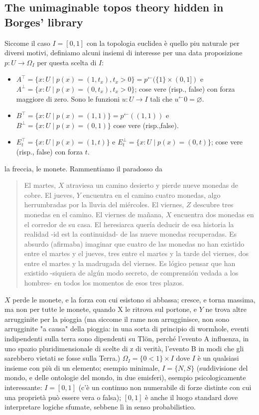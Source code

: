 \subsection{The unimaginable topos theory hidden in Borges' library}
\begin{remark}
  Siccome il caso $I=[0,1]$ con la topologia euclidea è quello piu naturale per diversi motivi, definiamo alcuni insiemi di interesse per una data proposizione $p : U \to \Omega_I$ per questa scelta di $I$:
\begin{itemize}
  \item $A^\top = \{x : U \mid p(x) = (1,t_x), t_x > 0\} = p^\leftarrow(\{1\}\times (0,1])$ e $A^\perp = \{x : U \mid p(x) = (0,t_x), t_x > 0\}$; cose vere (risp., false) con forza maggiore di zero. Sono le funzioni $u : U \to I$ tali che $u^\leftarrow 0 = \varnothing$.
  \item $B^\top = \{x : U \mid p(x) = (1,1)\} = p^\leftarrow((1,1))$ e $B^\perp = \{x : U \mid p(x) = (0,1)\}$ cose vere (risp.,false).
  \item $E_t^\top = \{ x : U \mid p(x)=(1,t)\}$ e $E_t^\perp = \{ x : U \mid p(x)=(0,t)\}$; cose vere (risp., false) con forza $t$.
\end{itemize}
\end{remark}
\begin{example}
  la freccia, le monete. Rammentiamo il paradosso da \cite{} 
  \begin{quote}
    El martes, $X$ atraviesa un camino desierto y pierde nueve monedas de cobre.
    El jueves, $Y$ encuentra en el camino cuatro monedas, algo herrumbradas por la
    lluvia del miércoles. El viernes, $Z$ descubre tres monedas en el camino. El viernes
    de mañana, $X$ encuentra dos monedas en el corredor de su casa. El heresiarca
    quería deducir de esa historia la realidad -id est la continuidad- de las nueve
    monedas recuperadas. Es absurdo (afirmaba) imaginar que cuatro de las
    monedas no han existido entre el martes y el jueves, tres entre el martes y la
    tarde del viernes, dos entre el martes y la madrugada del viernes. Es lógico
    pensar que han existido -siquiera de algún modo secreto, de comprensión vedada
    a los hombres- en todos los momentos de esos tres plazos. 
  \end{quote}
  $X$ perde le monete, e la forza con cui esistono si abbassa; cresce, e torna massima, ma non per tutte le monete, quando X le ritrova sul portone,  e $Y$ ne trova altre arrugginite per la pioggia (ma siccome il rame non arrugginisce, non sono arrugginite "a causa" della pioggia: in una sorta di principio di wormhole, eventi indipendenti sulla terra sono dipendenti su Tlön, perché l'evento A influenza, in uno spazio pluridimensionale di scelte di z di verità, l'evento B in modi che gli sarebbero vietati se fosse sulla Terra.) $\Omega_I = \{0<1\}\times I$ dove $I$ è un qualsiasi insieme con più di un elemento; esempio minimale, $I=\{N,S\}$ (suddivisione del mondo, e delle ontologie del mondo, in due emisferi), esempio psicologicamente interessante: $I=[0,1]$ (c'è un continuo non numerabile di forze distinte con cui una proprietà può essere vera o falsa); $[0,1]$ è anche il luogo standard dove interpretare logiche sfumate, sebbene lì in senso probabilistico.
\end{example}
